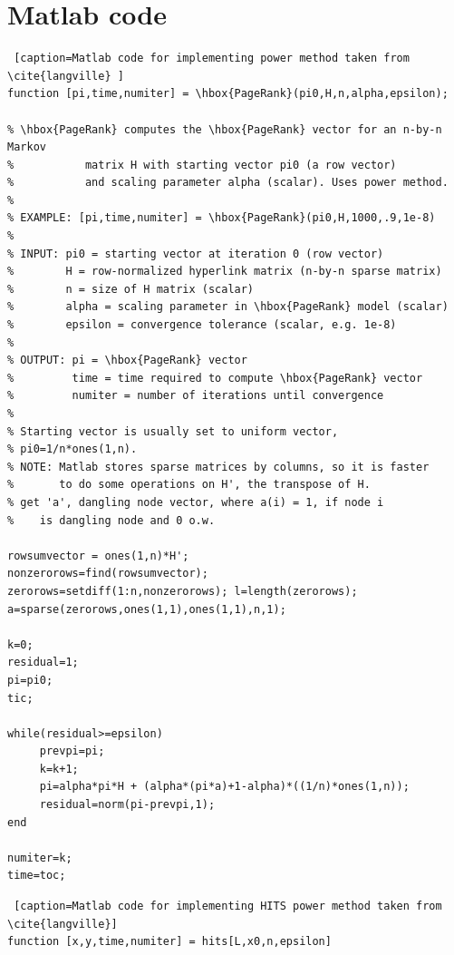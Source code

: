 \documentclass[11pt]{report}
\begin{document}
{\begin{appendices}
\begin{table}[h]
\begin{tabular} {r l| c }
 \end{tabular}
 \label{Table:Durham cars}
\end{table}

\chapter{Matlab code} \label{app:code}

\begin{lstlisting} [caption=Matlab code for implementing power method taken from \cite{langville} ]
function [pi,time,numiter] = \hbox{PageRank}(pi0,H,n,alpha,epsilon);

% \hbox{PageRank} computes the \hbox{PageRank} vector for an n-by-n Markov
%           matrix H with starting vector pi0 (a row vector)
%           and scaling parameter alpha (scalar). Uses power method.
%
% EXAMPLE: [pi,time,numiter] = \hbox{PageRank}(pi0,H,1000,.9,1e-8)
%
% INPUT: pi0 = starting vector at iteration 0 (row vector)
%        H = row-normalized hyperlink matrix (n-by-n sparse matrix)
%        n = size of H matrix (scalar)
%        alpha = scaling parameter in \hbox{PageRank} model (scalar)
%        epsilon = convergence tolerance (scalar, e.g. 1e-8)
%
% OUTPUT: pi = \hbox{PageRank} vector
%         time = time required to compute \hbox{PageRank} vector
%         numiter = number of iterations until convergence
%        
% Starting vector is usually set to uniform vector,
% pi0=1/n*ones(1,n).
% NOTE: Matlab stores sparse matrices by columns, so it is faster
%       to do some operations on H', the transpose of H.
% get 'a', dangling node vector, where a(i) = 1, if node i 
%    is dangling node and 0 o.w.

rowsumvector = ones(1,n)*H';
nonzerorows=find(rowsumvector);
zerorows=setdiff(1:n,nonzerorows); l=length(zerorows);
a=sparse(zerorows,ones(1,1),ones(1,1),n,1);

k=0;
residual=1;
pi=pi0;
tic;

while(residual>=epsilon)
     prevpi=pi;
     k=k+1;
     pi=alpha*pi*H + (alpha*(pi*a)+1-alpha)*((1/n)*ones(1,n));
     residual=norm(pi-prevpi,1);
end

numiter=k;
time=toc;

\end{lstlisting}

\begin{lstlisting} [caption=Matlab code for implementing HITS power method taken from \cite{langville}]
function [x,y,time,numiter] = hits[L,x0,n,epsilon] 


\end{lstlisting}
\end{appendices}}
\end{document}
